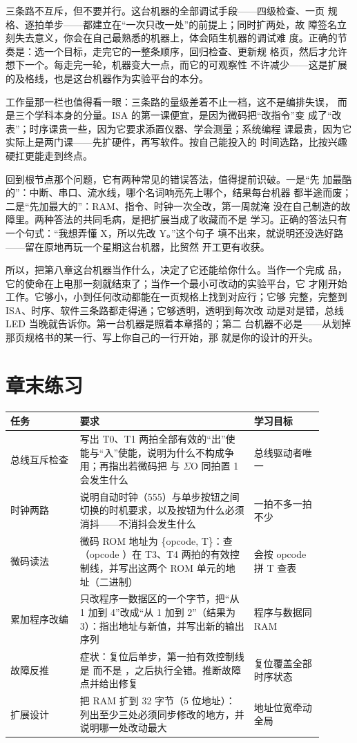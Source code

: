 三条路不互斥，但不要并行。这台机器的全部调试手段——四级检查、一页
规格、逐拍单步——都建立在“一次只改一处”的前提上；同时扩两处，故
障签名立刻失去意义，你会在自己最熟悉的机器上，体会陌生机器的调试难
度。正确的节奏是：选一个目标，走完它的一整条顺序，回归检查、更新规
格页，然后才允许想下一个。每走完一轮，机器变大一点，而它的可观察性
不许减少——这是扩展的及格线，也是这台机器作为实验平台的本分。

工作量那一栏也值得看一眼：三条路的量级差着不止一档，这不是编排失误，
而是三个学科本身的分量。ISA 的第一课便宜，是因为微码把“改指令”变
成了“改表”；时序课贵一些，因为它要求添置仪器、学会测量；系统编程
课最贵，因为它实际上是两门课——先扩硬件，再写软件。按自己能投入的
时间选路，比按兴趣硬扛更能走到终点。

回到根节点那个问题，它有两种常见的错误答法，值得提前识破。一是“先
加最酷的”：中断、串口、流水线，哪个名词响亮先上哪个，结果每台机器
都半途而废；二是“先加最大的”：RAM、指令、时钟一次全改，第一周就淹
没在自己制造的故障里。两种答法的共同毛病，是把扩展当成了收藏而不是
学习。正确的答法只有一个句式：“我想弄懂 X，所以先改 Y。”这个句子
填不出来，就说明还没选好路——留在原地再玩一个星期这台机器，比贸然
开工更有收获。

所以，把第八章这台机器当作什么，决定了它还能给你什么。当作一个完成
品，它的使命在上电那一刻就结束了；当作一个最小可改动的实验平台，它
才刚开始工作。它够小，小到任何改动都能在一页规格上找到对应行；它够
完整，完整到 ISA、时序、软件三条路都走得通；它够透明，透明到每次改
动是对是错，总线 LED 当晚就告诉你。第一台机器是照着本章搭的；第二
台机器不必是——从划掉那页规格书的某一行、写上你自己的一行开始，那
就是你的设计的开头。

\section*{章末练习}

\begin{longtable}{L{0.2\linewidth}L{0.5\linewidth}L{0.2\linewidth}}
\toprule
任务 & 要求 & 学习目标 \\
\midrule
总线互斥检查 & 写出 T0、T1 两拍全部有效的“出”使能与“入”使能，说明为什么不构成争用；再指出若微码把  与 $\Sigma$O 同拍置 1 会发生什么 & 总线驱动者唯一 \\
时钟两路 & 说明自动时钟（555）与单步按钮之间切换的时机要求，以及按钮为什么必须消抖——不消抖会发生什么 & 一拍不多一拍不少 \\
微码读法 & 微码 ROM 地址为 \{opcode, T\}：查 （opcode ）在 T3、T4 两拍的有效控制线，并写出这两个 ROM 单元的地址（二进制） & 会按 opcode 拼 T 查表 \\
累加程序改编 & 只改程序一数据区的一个字节，把“从 1 加到 4”改成“从 1 加到 2”（结果为 3）：指出地址与新值，并写出新的输出序列 & 程序与数据同 RAM \\
故障反推 & 症状：复位后单步，第一拍有效控制线是  而不是 ，之后执行全错。推断故障点并给出修复 & 复位覆盖全部时序状态 \\
扩展设计 & 把 RAM 扩到 32 字节（5 位地址）：列出至少三处必须同步修改的地方，并说明哪一处改动最大 & 地址位宽牵动全局 \\
\bottomrule
\end{longtable}

